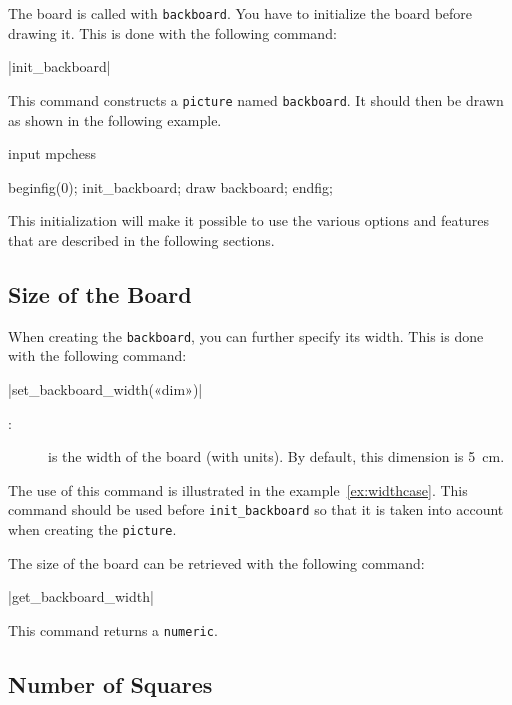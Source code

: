 \documentclass[english]{ltxdoc}
\begin{document}
The board is called with \mpchess{} \lstinline+backboard+.
You have to initialize the board before drawing it. This is done with the
following command:\par

\commande|init_backboard|\smallskip{}

This command constructs a \MP{} \lstinline+picture+ named
\mbox{\lstinline+backboard+.} It should then be drawn as shown in the following example.
\begin{ExempleMP}
input mpchess

beginfig(0);
init_backboard;
draw backboard;
endfig;
\end{ExempleMP}

This initialization will make it possible to use the
various options and features that are described in the
following sections.

\subsection{Size of the Board}

When creating the \lstinline+backboard+, you can further specify its width. This is done with the following command:\par\bigskip

\commande|set_backboard_width(«dim»)|\smallskip{}

\begin{description}
  \item[:] is the width of the board (with units). By default, this dimension is \SI{5}{cm}.
\end{description}

The use of this command is illustrated in the example~\ref{ex:widthcase}. This
command should be used before \lstinline+init_backboard+ so that it is taken
into account when creating the \lstinline+picture+. 
\bigskip

The size of the board can be retrieved with the following command:

\commande|get_backboard_width|\smallskip{}

This command returns a \lstinline+numeric+.

\subsection{Number of Squares}
\end{document}
